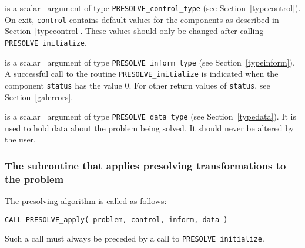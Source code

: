 \documentclass{galahad}
\newcommand{\packagename}{PRESOLVE}
\begin{document}
\begin{description}
 is a scalar \intentout\ argument of type 
{\tt \packagename\_control\_type}
(see Section~\ref{typecontrol}). 
On exit, {\tt control} contains default values for the components as
described in Section~\ref{typecontrol}.
These values should only be changed after calling 
{\tt \packagename\_initialize}.

 is a scalar \intentout\ argument of type 
{\tt \packagename\_inform\_type} (see Section~\ref{typeinform}).  
A successful call to the routine {\tt \packagename\_initialize}
is indicated when the  component {\tt status} has the value 0. 
For other return values of {\tt status}, see Section~\ref{galerrors}.

 is a scalar \intentinout\ argument of type 
{\tt \packagename\_data\_type}
(see Section~\ref{typedata}). It is used to hold data about the problem being 
solved. It should never be altered by the user. 
\end{description}


\subsubsection{The subroutine that applies presolving transformations to the problem}
The presolving algorithm is called as follows:
\vspace*{1mm}

\hspace{8mm}
{\tt CALL \packagename\_apply( problem, control, inform, data )}

\noindent
Such a call must always be preceded by a call to {\tt \packagename\_initialize}.
\end{document}
